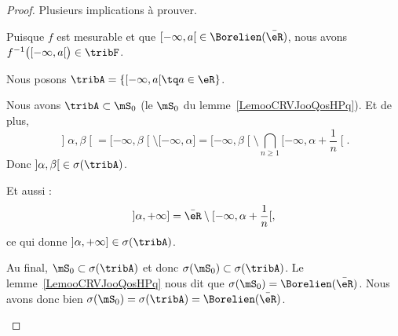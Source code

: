 \begin{proof}
    Plusieurs implications à prouver.
    \begin{subproof}
        \item[\ref{ITEMooHAMHooYLqUhVi}\( \Rightarrow\)\ref{ITEMooHAMHooYLqUhVii}]
            Puisque \( f\) est mesurable et que \( \mathopen[ -\infty , a \mathclose[\in\Borelien(\bar\eR)\), nous avons \( f^{-1}\big( \mathopen[ -\infty , a \mathclose[ \big)\in\tribF\).
        \item[\ref{ITEMooHAMHooYLqUhVii}\( \Rightarrow\)\ref{ITEMooHAMHooYLqUhVi}]
            Nous posons \( \tribA=\{ \mathopen[ -\infty , a \mathclose[\tq a\in \eR \}\).

            Nous avons \( \tribA\subset\mS_0\) (le \( \mS_0\) du lemme~\ref{LemooCRVJooQosHPq}). Et de plus,
            \begin{equation}
                \mathopen] \alpha , \beta \mathclose[=\mathopen[ -\infty , \beta \mathclose[\setminus\mathopen[ -\infty , \alpha \mathclose]=\mathopen[ -\infty , \beta \mathclose[\setminus\bigcap_{n\geq 1}\mathopen[ -\infty , \alpha+\frac{1}{ n } \mathclose[.
            \end{equation}
            Donc \( \mathopen] \alpha , \beta \mathclose[\in\sigma(\tribA)\).

            Et aussi :
            \begin{equation}
                \mathopen] \alpha , +\infty \mathclose]=\bar\eR\setminus\mathopen[ -\infty , \alpha+\frac{1}{ n } \mathclose[,
            \end{equation}
            ce qui donne \( \mathopen] \alpha , +\infty \mathclose]\in \sigma(\tribA)\).

            Au final, \( \mS_0\subset\sigma(\tribA)\) et donc \( \sigma(\mS_0)\subset\sigma(\tribA)\). Le lemme~\ref{LemooCRVJooQosHPq} nous dit que \( \sigma(\mS_0)=\Borelien(\bar \eR)\). Nous avons donc bien \( \sigma(\mS_0)=\sigma(\tribA)=\Borelien(\bar\eR)\).


\end{subproof}
\end{proof}
